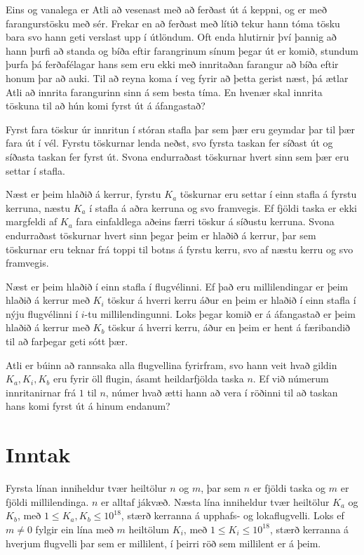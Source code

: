 
Eins og vanalega er Atli að vesenast með að ferðast út á keppni, og er með farangurstösku með sér. Frekar en að ferðast með lítið tekur hann tóma
tösku bara svo hann geti verslast upp í útlöndum. Oft enda hlutirnir því þannig að hann þurfi að standa og bíða eftir farangrinum sínum þegar út
er komið, stundum þurfa þá ferðafélagar hans sem eru ekki með innritaðan farangur að bíða eftir honum þar að auki. Til að reyna koma í veg fyrir
að þetta gerist næst, þá ætlar Atli að innrita farangurinn sinn á sem besta tíma. En hvenær skal innrita töskuna til að hún komi fyrst út á áfangastað?

Fyrst fara töskur úr innritun í stóran stafla þar sem þær eru geymdar þar til þær fara út í vél. Fyrstu töskurnar lenda neðst, svo fyrsta taskan
fer síðast út og síðasta taskan fer fyrst út. Svona endurraðast töskurnar hvert sinn sem þær eru settar í stafla. 

Næst er þeim hlaðið á kerrur, fyrstu $K_a$ töskurnar eru settar í einn stafla á fyrstu kerruna, næstu $K_a$ í stafla á aðra kerruna og svo framvegis. 
Ef fjöldi taska er ekki margfeldi af $K_a$ fara einfaldlega aðeins færri töskur á síðustu kerruna. Svona endurraðast töskurnar hvert sinn þegar
þeim er hlaðið á kerrur, þar sem töskurnar eru teknar frá toppi til botns á fyrstu kerru, svo af næstu kerru og svo framvegis.

Næst er þeim hlaðið í einn stafla í flugvélinni. Ef það eru millilendingar er þeim hlaðið á kerrur með $K_i$ töskur á hverri kerru áður en þeim
er hlaðið í einn stafla í nýju flugvélinni í $i$-tu millilendingunni. Loks þegar komið er á áfangastað er þeim hlaðið
á kerrur með $K_b$ töskur á hverri kerru, áður en þeim er hent á færibandið til að farþegar geti sótt þær.

Atli er búinn að rannsaka alla flugvellina fyrirfram, svo hann veit hvað gildin $K_a, K_i, K_b$ eru fyrir öll flugin, ásamt heildarfjölda taska
$n$. Ef við númerum innritanirnar frá $1$ til $n$, númer hvað ætti hann að vera í röðinni til að taskan hans komi fyrst út á hinum endanum?

\section*{Inntak}
Fyrsta línan inniheldur tvær heiltölur $n$ og $m$, þar sem $n$ er fjöldi taska og $m$ er fjöldi millilendinga. $n$ er alltaf jákvæð.
Næsta lína inniheldur tvær heiltölur $K_a$ og $K_b$, með $1 \leq K_a, K_b \leq 10^{18}$, stærð kerranna á upphafs- og lokaflugvelli.
Loks ef $m \neq 0$ fylgir ein lína með $m$ heiltölum $K_i$, með $1 \leq K_i \leq 10^{18}$, stærð kerranna á hverjum flugvelli þar sem er millilent,
í þeirri röð sem millilent er á þeim.

